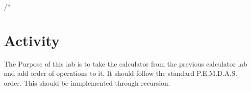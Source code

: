 /*%
\section{Activity}

The Purpose of this lab is to take the calculator from the previous calculator lab and add order of operations to it. It should follow the standard P.E.M.D.A.S. order. This should be inmplemented through recursion.